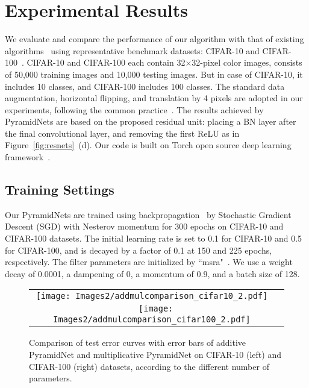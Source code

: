 \documentclass[10pt,twocolumn,letterpaper]{article}
\begin{document}
\section{Experimental Results}
\label{section:exp}







We evaluate and compare the performance of our algorithm with that of existing algorithms~\cite{resnet,preresnet,NiN,weightedresnet,wideresnet} using representative benchmark datasets: CIFAR-10 and CIFAR-100~\cite{cifar}. CIFAR-10 and CIFAR-100 each contain 32$\times$32-pixel color images, consists of 50,000 training images and 10,000 testing images. But in case of CIFAR-10, it includes 10 classes, and CIFAR-100 includes 100 classes. The standard data augmentation, horizontal flipping, and translation by 4 pixels are adopted in our experiments, following the common practice~\cite{NiN}. The results achieved by PyramidNets are based on the proposed residual unit: placing a BN layer after the final convolutional layer, and removing the first ReLU as in Figure~\ref{fig:resnets}~(d). Our code is built on Torch open source deep learning framework~\cite{torch7}.

\subsection{Training Settings}

Our PyramidNets are trained using backpropagation~\cite{backprop} by Stochastic Gradient Descent (SGD) with Nesterov momentum for 300 epochs on CIFAR-10 and CIFAR-100 datasets. The initial learning rate is set to 0.1 for CIFAR-10 and 0.5 for CIFAR-100, and is decayed by a factor of 0.1 at 150 and 225 epochs, respectively. The filter parameters are initialized by ``msra"~\cite{prelu}. We use a weight decay of 0.0001, a dampening of 0, a momentum of 0.9, and a batch size of 128.
\begin{figure}[t]
\begin{center}
\begin{tabular}{cc}
\texttt{[image: Images2/addmulcomparison\_cifar10\_2.pdf]} \ \quad
\texttt{[image: Images2/addmulcomparison\_cifar100\_2.pdf]}
\end{tabular}
\end{center}
\caption{Comparison of test error curves with error bars of additive PyramidNet and multiplicative PyramidNet on CIFAR-10 (left) and CIFAR-100 (right) datasets, according to the different number of parameters.}
\label{fig:addmulcomparision}
\vspace{-3mm}
\end{figure}
\end{document}
